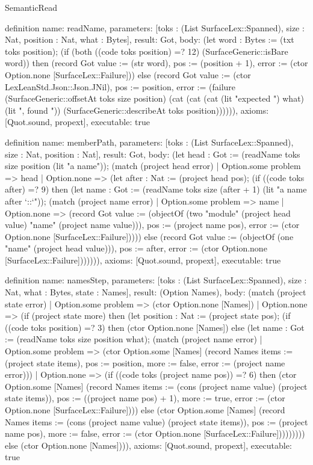 \begin{lexlean}{SemanticRead}
\begin{semanticmodule}
definition{
  name: readName,
  parameters: [toks : (List SurfaceLex::Spanned), size : Nat, position : Nat, what : Bytes],
  result: Got,
  body: (let word : Bytes := (txt toks position); (if (both ((code toks position) =? 12) (SurfaceGeneric::isBare word)) then (record Got {value := (str word), pos := (position + 1), error := (ctor Option.none [SurfaceLex::Failure])}) else (record Got {value := (ctor LexLeanStd.Json::Json.JNil), pos := position, error := (failure (SurfaceGeneric::offsetAt toks size position) (cat (cat (cat (lit "expected ") what) (lit ", found ")) (SurfaceGeneric::describeAt toks position)))}))),
  axioms: [Quot.sound, propext],
  executable: true
}

definition{
  name: memberPath,
  parameters: [toks : (List SurfaceLex::Spanned), size : Nat, position : Nat],
  result: Got,
  body: (let head : Got := (readName toks size position (lit "a name")); (match (project head error)
    | Option.some problem => head
    | Option.none => (let after : Nat := (project head pos); (if ((code toks after) =? 9) then (let name : Got := (readName toks size (after + 1) (lit "a name after `::`")); (match (project name error)
      | Option.some problem => name
      | Option.none => (record Got {value := (objectOf (two "module" (project head value) "name" (project name value))), pos := (project name pos), error := (ctor Option.none [SurfaceLex::Failure])}))) else (record Got {value := (objectOf (one "name" (project head value))), pos := after, error := (ctor Option.none [SurfaceLex::Failure])}))))),
  axioms: [Quot.sound, propext],
  executable: true
}

definition{
  name: namesStep,
  parameters: [toks : (List SurfaceLex::Spanned), size : Nat, what : Bytes, state : Names],
  result: (Option Names),
  body: (match (project state error)
    | Option.some problem => (ctor Option.none [Names])
    | Option.none => (if (project state more) then (let position : Nat := (project state pos); (if ((code toks position) =? 3) then (ctor Option.none [Names]) else (let name : Got := (readName toks size position what); (match (project name error)
      | Option.some problem => (ctor Option.some [Names] (record Names {items := (project state items), pos := position, more := false, error := (project name error)}))
      | Option.none => (if ((code toks (project name pos)) =? 6) then (ctor Option.some [Names] (record Names {items := (cons (project name value) (project state items)), pos := ((project name pos) + 1), more := true, error := (ctor Option.none [SurfaceLex::Failure])})) else (ctor Option.some [Names] (record Names {items := (cons (project name value) (project state items)), pos := (project name pos), more := false, error := (ctor Option.none [SurfaceLex::Failure])}))))))) else (ctor Option.none [Names]))),
  axioms: [Quot.sound, propext],
  executable: true
}


\end{semanticmodule}
\end{lexlean}
